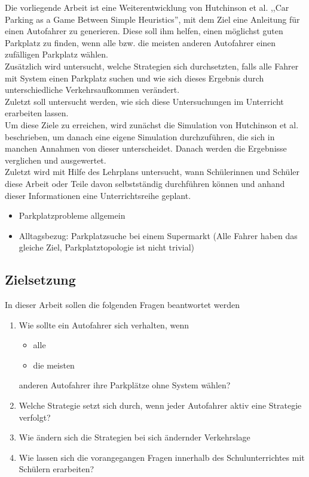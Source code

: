 Die vorliegende Arbeit ist eine Weiterentwicklung von Hutchinson et al. ,,Car Parking as a Game Between Simple Heuristics'', mit dem Ziel eine Anleitung für einen Autofahrer zu generieren. Diese soll ihm helfen, einen möglichst guten Parkplatz zu finden, wenn alle bzw. die meisten anderen Autofahrer einen zufälligen Parkplatz wählen.\\
Zusätzlich wird untersucht, welche Strategien sich durchsetzten, falls alle Fahrer mit System einen Parkplatz suchen und wie sich dieses Ergebnis durch unterschiedliche Verkehrsaufkommen verändert.\\
 Zuletzt soll untersucht werden, wie sich diese Untersuchungen im Unterricht erarbeiten lassen.\\
  Um diese Ziele zu erreichen, wird zunächst die Simulation von Hutchinson et al. beschrieben, um danach eine eigene Simulation durchzuführen, die sich in manchen Annahmen von dieser unterscheidet. Danach werden die Ergebnisse verglichen und ausgewertet.\\
  Zuletzt wird mit Hilfe des Lehrplans untersucht, wann Schülerinnen und Schüler diese Arbeit oder Teile davon selbstständig durchführen können und anhand dieser Informationen eine Unterrichtsreihe geplant.
\begin{itemize}
	\item Parkplatzprobleme allgemein
	\item Alltagsbezug: Parkplatzsuche bei einem Supermarkt (Alle Fahrer haben das gleiche Ziel, Parkplatztopologie ist nicht trivial)
\end{itemize}

\subsection{Zielsetzung}
In dieser Arbeit sollen die folgenden Fragen beantwortet werden
\begin{enumerate}
	\item Wie sollte ein Autofahrer sich verhalten, wenn
	\begin{itemize}
		\item alle 
		\item die meisten
	\end{itemize}
	anderen Autofahrer ihre Parkplätze ohne System wählen?
	\item Welche Strategie setzt sich durch, wenn jeder Autofahrer aktiv eine Strategie verfolgt?
	\item Wie ändern sich die Strategien bei sich ändernder Verkehrslage
	\item Wie lassen sich die vorangegangen Fragen innerhalb des Schulunterrichtes mit Schülern erarbeiten?
\end{enumerate}

